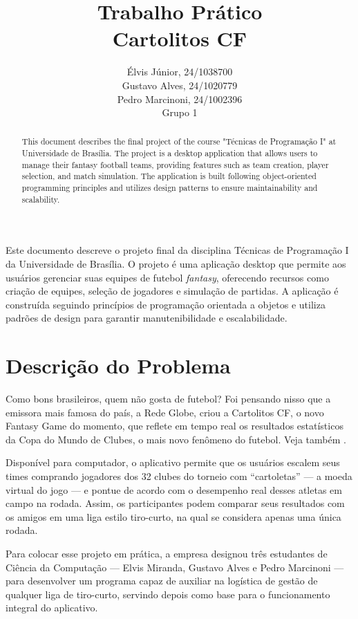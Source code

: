 \documentclass[12pt]{article}
\title{Trabalho Prático\\ 
Cartolitos CF}
\author{Élvis Júnior, 24/1038700\\
        Gustavo Alves, 24/1020779\\
        Pedro Marcinoni, 24/1002396\\
        Grupo 1
}
\begin{document}
\maketitle

\begin{abstract}
  This document describes the final project of the course "Técnicas de Programação I" at Universidade de Brasília. The project is a desktop application that allows users to manage their fantasy football teams, providing features such as team creation, player selection, and match simulation. The application is built following object-oriented programming principles and utilizes design patterns to ensure maintainability and scalability.
\end{abstract}

\begin{resumo}
  Este documento descreve o projeto final da disciplina Técnicas de Programação I da Universidade de Brasília. O projeto é uma aplicação desktop que permite aos usuários gerenciar suas equipes de futebol \textit{fantasy}, oferecendo recursos como criação de equipes, seleção de jogadores e simulação de partidas. A aplicação é construída seguindo princípios de programação orientada a objetos e utiliza padrões de design para garantir manutenibilidade e escalabilidade.
\end{resumo}


\section{Descrição do Problema}
\label{sec:descricao}

Como bons brasileiros, quem não gosta de futebol? Foi pensando nisso que a emissora mais famosa do país, a Rede Globe, criou a Cartolitos CF, o novo Fantasy Game do momento, que reflete em tempo real os resultados estatísticos da Copa do Mundo de Clubes, o mais novo fenômeno do futebol. Veja também \cite{wiki:cartola,wiki:fantasy}.

Disponível para computador, o aplicativo permite que os usuários escalem seus times comprando jogadores dos 32 clubes do torneio com “cartoletas” — a moeda virtual do jogo — e pontue de acordo com o desempenho real desses atletas em campo na rodada. Assim, os participantes podem comparar seus resultados com os amigos em uma liga estilo tiro-curto, na qual se considera apenas uma única rodada.

Para colocar esse projeto em prática, a empresa designou três estudantes de Ciência da Computação — Elvis Miranda, Gustavo Alves e Pedro Marcinoni — para desenvolver um programa capaz de auxiliar na logística de gestão de qualquer liga de tiro-curto, servindo depois como base para o funcionamento integral do aplicativo.
\end{document}
